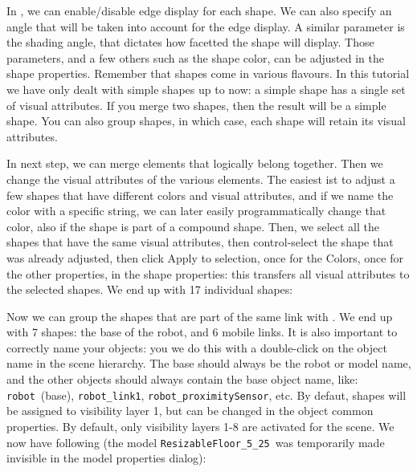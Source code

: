 
In \vrep, we can enable/disable edge display for each shape. We can also 
specify an angle that will be taken into account for the edge display. A
similar parameter is the shading angle, that dictates how facetted the shape 
will display. Those parameters, and a few others such as the shape color, can
be adjusted in the shape properties. Remember that shapes come in various 
flavours. In this tutorial we have only dealt with simple shapes up to now: 
a simple shape has a single set of visual attributes. If you merge two shapes, then the result will be a
simple shape. You can also group shapes, in which case, each shape will 
retain its visual attributes.

In next step, we can merge elements that logically belong together.
Then we change the visual attributes of the various elements. The easiest ist 
to adjust a few shapes that have different colors and visual attributes, and 
if we name the color with a specific string, we can later easily 
programmatically change that color, also if the shape is part of a compound 
shape. Then, we select all the shapes that have the same visual attributes, 
then control-select the shape that was already adjusted, then click Apply to
selection, once for the Colors, once for the other properties, in the shape
properties: this transfers all visual attributes to the selected 
shapes. We end up with 17 
individual shapes:


Now we can group the shapes that are part of the same link with
. We end up with 7 
shapes: the base of the robot, 
and 6 mobile links. It is also important to correctly name your objects: you 
we do this with a double-click on the object name in the scene hierarchy. The 
base should always be the robot or model name, and the other objects should 
always contain the base object name, like: \verb|robot|\ (base), 
\verb|robot_link1|, \verb|robot_proximitySensor|, etc. By defaut, shapes will 
be assigned to visibility layer 1, but can be changed in the object common 
properties. By default, only visibility layers 1-8 are activated for the 
scene. We now have following (the model \verb|ResizableFloor_5_25|\ was
temporarily made invisible in the model properties dialog):

